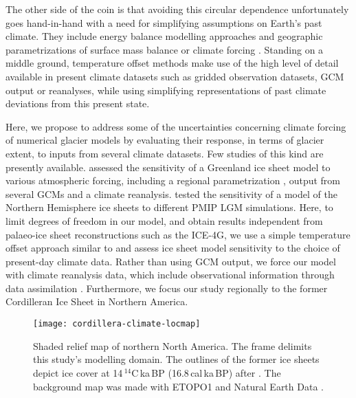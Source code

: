 The other side of the coin is that avoiding this circular dependence unfortunately goes hand-in-hand with a need for simplifying assumptions on Earth's past climate. They include energy balance modelling approaches \citep{tarasov-peltier-1997} and geographic parametrizations of surface mass balance \citep{robert-1991} or climate forcing \citep{johnson-fastook-2002}. Standing on a middle ground, temperature offset methods \citep{greve-etal-1999,bintanja-etal-2005} make use of the high level of detail available in present climate datasets such as gridded observation datasets, GCM output or reanalyses, while using simplifying representations of past climate deviations from this present state.

Here, we propose to address some of the uncertainties concerning climate forcing of numerical glacier models by evaluating their response, in terms of glacier extent, to inputs from several climate datasets. Few studies of this kind are presently available. \citet{quiquet-etal-2012} assessed the sensitivity of a Greenland ice sheet model to various atmospheric forcing, including a regional parametrization \citep{fausto-etal-2009}, output from several GCMs and a climate reanalysis. \citet{rodgers-etal-2004,charbit-etal-2007} tested the sensitivity of a model of the Northern Hemisphere ice sheets to different PMIP LGM simulations. Here, to limit degrees of freedom in our model, and obtain results independent from palaeo-ice sheet reconstructions such as the ICE-4G, we use a simple temperature offset approach similar to \citep{greve-etal-1999,bintanja-etal-2005} and assess ice sheet model sensitivity to the choice of present-day climate data. Rather than using GCM output, we force our model with climate reanalysis data, which include observational information through data assimilation \citep{bengtsson-etal-2007}. Furthermore, we focus our study regionally to the former Cordilleran Ice Sheet in Northern America.

\begin{figure}[t]
	\vspace*{2mm}
	\begin{center}
		\texttt{[image: cordillera-climate-locmap]}
	\end{center}
	\caption{Shaded relief map of northern North America. The frame delimits this study's modelling domain. The outlines of the former ice sheets depict ice cover at 14\,$^{14}$C\,ka\,BP (16.8\,cal\,ka\,BP) after \citet{dyke-2004}. The background map was made with ETOPO1 \citep{data:etopo1} and Natural Earth Data \citep{data:naturalearth}.}
	\label{fig:locmap}
\end{figure}

